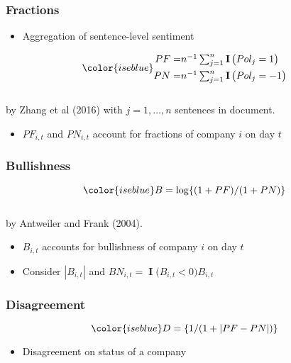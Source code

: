 \begin{frame}
    \frametitle{Fractions}
    \begin{itemize}
        \item Aggregation of sentence-level sentiment
    \end{itemize}
    \vspace{10pt}
    \small
    \begin{equation}
    {\color{iseblue}
    \begin{aligned}
        PF =&
        \textstyle n^{-1} \sum_{j=1}^n{ \operatorname{\mathbf{I}}\big( Pol_j = 1 \big) }\\
        PN =&
        \textstyle n^{-1} \sum_{j=1}^n{\operatorname{\mathbf{I}}\big( Pol_j = -1 \big) }
    \end{aligned}
    }
    \end{equation} \\

    \vspace{10pt}
    \normalsize
    by {\color{iseblue} Zhang et al (2016)} with $j = 1, \dots, n$ sentences in document.
    \vspace{20pt}

    \begin{itemize}
        \item $PF_{i, t}$ and $PN_{i, t}$ account for fractions of company $i$ on day $t$
    \end{itemize}
\end{frame}


\begin{frame}
    \frametitle{Bullishness}
    \vspace{15pt}
    \small
    \begin{equation}
        {\color{iseblue}
        B = 
        \log \{(1 + PF) / (1 + PN)\}
        }
    \end{equation} \\

    \vspace{10pt}
    \normalsize
    by {\color{iseblue} Antweiler and Frank (2004)}.
    \vspace{20pt}

    \begin{itemize}
        \item $B_{i, t}$ accounts for bullishness of company $i$ on day $t$
        \item Consider $|B_{i, t}|$ and $BN_{i, t} = \operatorname{\mathbf{I}}\big( B_{i, t} < 0 \big) B_{i, t} $
    \end{itemize}
\end{frame}

\begin{frame}
    \frametitle{Disagreement}
    \vspace{15pt}
    \small
    \begin{equation}
        {\color{iseblue}
        D = \{1 / (1 + |PF - PN|)\}
        }
    \end{equation}
    \begin{itemize}
        \item Disagreement on status of a company
    \end{itemize}
\end{frame}
